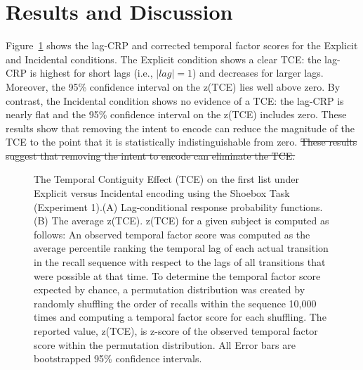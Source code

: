 \documentclass[man,natbib,floatsintext]{apa6} %
\begin{document}
\section{Results and Discussion}

Figure~\ref{e1_l1_crp} shows the lag-CRP and corrected temporal factor scores for the Explicit and Incidental conditions. The Explicit condition shows a clear TCE: the lag-CRP is highest for short lags (i.e., $|lag|=1$) and decreases for larger lags. Moreover, the 95\% confidence interval on the z(TCE) lies well above zero. By contrast, the Incidental condition shows no evidence of a TCE: the lag-CRP is nearly flat and the 95\% confidence interval on the z(TCE) includes zero. \color{red} These results show that removing the intent to encode can reduce the magnitude of the TCE to the point that it is statistically indistinguishable from zero.\color{black}  \st{These results suggest that removing the intent to encode can eliminate the TCE.}



\newcommand\paneltext{(A) Lag-conditional response probability functions. (B) The average z(TCE). z(TCE) for a given subject is computed as follows: An observed temporal factor score was computed as the average percentile ranking the temporal lag of each actual transition in the recall sequence with respect to the lags of all transitions that were possible at that time. To determine the temporal factor score expected by chance, a permutation distribution was created by randomly shuffling the order of recalls within the sequence 10,000 times and computing a temporal factor score for each shuffling. The reported value, z(TCE), is z-score of the observed temporal factor score within the permutation distribution. All Error bars are bootstrapped 95\% confidence intervals.}
\begin{figure}
\caption{The Temporal Contiguity Effect (TCE) on the first list under Explicit versus Incidental encoding using the Shoebox Task (Experiment 1).\paneltext}
\label{e1_l1_crp}
\end{figure}
\end{document}
